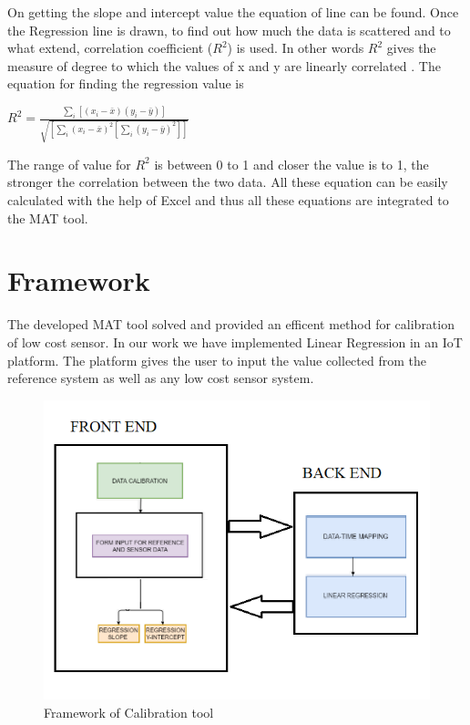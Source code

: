 On getting the slope and intercept value the equation of line can be found. Once the Regression line is drawn, to find out how much the data is scattered and to what extend, correlation coefficient ($R^2$) is used. In other words $R^2$ gives the measure of  degree to which the values of x and y are linearly correlated \cite{Stone2001}. The equation for finding the regression value is

\begin{center}

    {\large $R^2 = \frac{\sum_i[(x_i-\bar x)(y_i-\bar y)]}{\sqrt{[\sum_i(x_i-\bar x)^2[\sum_i(y_i-\bar y)^2]]}}$ } \cite{Stone2001}

\end{center}
The range of value for $R^2$ is between 0 to 1 and closer the value is to 1, the stronger the correlation between the two data.
All these equation can be easily calculated with the help of Excel and thus all these equations are integrated to the MAT tool.


\section{Framework}

The developed MAT tool solved and provided an efficent method for calibration of low cost sensor. In our work we have implemented Linear Regression \cite{Burke} in an IoT platform. The platform gives the user to input the value collected from the reference system as well as any low cost sensor system. 

\begin{figure}[h]
  \begin{center}
  \includegraphics[scale=1.09]{./images/figure32.png} 
  \end{center}
  \caption{Framework of Calibration tool}
  \label{frame}
\end{figure}


